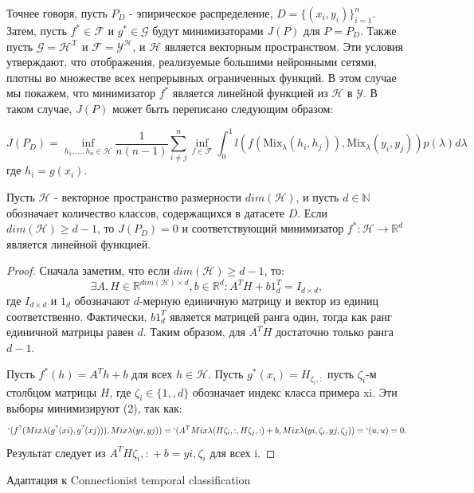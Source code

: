 Точнее говоря, пусть $P_D$ - эпирическое распределение, $D = \{(x_i, y_i)\}_{i=1}^{n}$. Затем, пусть $f^* \in \mathcal{F}$ и $g^* \in \mathcal{G}$ будут минимизаторами $J(P)$ для $P = P_D$. Также пусть $\mathcal{G} = \mathcal{H}^\mathcal{X}$ и $\mathcal{F} = \mathcal{Y}^\mathcal{H}$, и $\mathcal{H}$ является векторным пространством. Эти условия утверждают, что отображения, реализуемые большими нейронными сетями, плотны во множестве всех непрерывных ограниченных функций. В этом случае мы покажем, что минимизатор $f^*$ является линейной функцией из $\mathcal{H}$ в $\mathcal{Y}$. В таком случае, $J(P)$ может быть переписано следующим образом:

\begin{equation}
J(P_D) = \inf_{h_1,...,h_n \in \mathcal{H}} \frac{1}{n(n-1)} \sum_{i \neq j}^n \inf_{f \in \mathcal{F}} \int_{0
}^{1} l( f(\text{Mix}_{\lambda}(h_i, h_j)), \text{Mix}_{\lambda}(y_i, y_j)) p(\lambda) d\lambda
\end{equation}
где $h_i = g(x_i)$.

\begin{theorem}
Пусть $\mathcal{H}$ - векторное пространство размерности $dim(\mathcal{H})$, и пусть $d \in \mathbb{N}$ обозначает количество классов, содержащихся в датасете $D$. Если $dim (\mathcal{H}) \geq d-1$, то $J(P_D) = 0$ и соответствующий минимизатор $f^*: \mathcal{H} \rightarrow \mathbb{R}^d$ является линейной функцией.
\end{theorem}
\begin{proof}
Сначала заметим, что если $dim(\mathcal{H}) \geq d - 1$, то:
$$ \exists A, H \in \mathbb{R}^{dim(\mathcal{H}) \times d}, b \in \mathbb{R}^{d}: A^T H + b1_{d}^T = I_{d \times d}, $$
где $I_{d \times d}$ и $1_d$ обозначают $d$-мерную единичную матрицу и вектор из единиц соответственно. Фактически,
$b1_{d}^T$ является матрицей ранга один, тогда как ранг единичной матрицы равен $d$. Таким образом, для $A^T H$ достаточно только ранга $d - 1$.

Пусть $f^{*}(h) = A^T h + b$ для всех $h \in \mathcal{H}$. Пусть $g^{*}(x_i) = H_{\zeta_i,:}$ пусть $\zeta_i$-м столбцом матрицы $H$, где
$\zeta_i \in \{1, , d\}$ обозначает индекс класса примера xi. Эти выборы минимизируют (2), так как:
$$ `(f^?(Mix\lambda(g^?(xi), g^?(xj))), Mix\lambda(yi, yj)) = `(A^T Mix\lambda(H{\zeta_i,:}, H{\zeta_j,:}) + b, Mix\lambda(y{i,\zeta_i}, y{j,\zeta_j})) = `(u, u) = 0. $$
Результат следует из $A^T H{\zeta_i,:} + b = y{i,\zeta_i}$ для всех i.
\end{proof}

\paragprah Адаптация к Connectionist temporal classification


\newpage